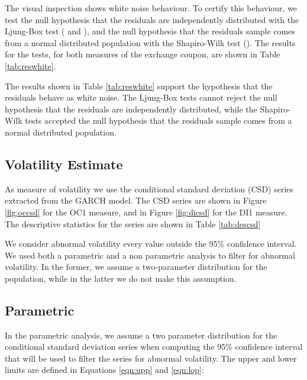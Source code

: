 \documentclass[cic,tc, english]{iiufrgs}
\begin{document}
    

    

    The visual inspection shows white noise behaviour. To certify this behaviour, we test the null hypothesis that the residuals are independently distributed with the Ljung-Box test (\citet{boxpierce} and \citet{ljungbox}), and the null hypothesis that the residuals sample comes from a normal distributed population with the Shapiro-Wilk test (\citet{shapirowilk}). The results for the tests, for both measures of the exchange coupon, are shown in Table \ref{tab:reswhite}.

    

    The results shown in Table \ref{tab:reswhite} support the hypothesis that the residuals behave as white noise. The Ljung-Box tests cannot reject the null hypothesis that the residuals are independently distributed, while the Shapiro-Wilk tests accepted the null hypothesis that the residuals sample comes from a normal distributed population.

\subsection{Volatility Estimate}

    As measure of volatility we use the conditional standard deviation (CSD) series extracted from the GARCH model. The CSD series are shown in Figure \ref{fig:occsd} for the OC1 measure, and in Figure \ref{fig:dicsd} for the DI1 measure. The descriptive statistics for the series are shown in Table \ref{tab:descsd}

    

    

    

    We consider abnormal volatility every value outside the 95\% confidence interval. We used both a parametric and a non parametric analysis to filter for abnormal volatility. In the former, we assume a two-parameter distribution for the population, while in the latter we do not make this assumption.

\subsection{Parametric}

    In the parametric analysis, we assume a two parameter distribution for the conditional standard deviation series when computing the 95\% confidence interval that will be used to filter the series for abnormal volatility. The upper and lower limits are defined in Equations \ref{eqn:upp} and \ref{eqn:lop}: 
\end{document}

